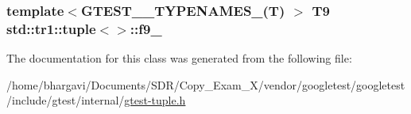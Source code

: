 \subsubsection[{\texorpdfstring{f9\+\_\+}{f9_}}]{\setlength{\rightskip}{0pt plus 5cm}template$<$G\+T\+E\+S\+T\+\_\+\_\+\+T\+Y\+P\+E\+N\+A\+M\+E\+S\+\_\+(\+T) $>$ T9 {\bf std\+::tr1\+::tuple}$<$$>$\+::f9\+\_\+}\hypertarget{classstd_1_1tr1_1_1tuple_a336d5e582fd34e45ec88c78d473671dd}{}\label{classstd_1_1tr1_1_1tuple_a336d5e582fd34e45ec88c78d473671dd}


The documentation for this class was generated from the following file\+:\begin{DoxyCompactItemize}
\item 
/home/bhargavi/\+Documents/\+S\+D\+R/\+Copy\+\_\+\+Exam\+\_\+X/vendor/googletest/googletest/include/gtest/internal/\hyperlink{gtest-tuple_8h}{gtest-\/tuple.\+h}\end{DoxyCompactItemize}
